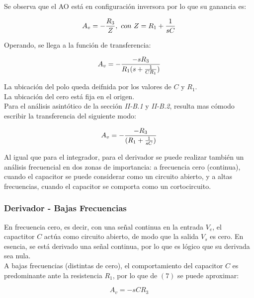 \documentclass[letterpaper, 10 pt, conference]{ieeeconf}  %
\begin{document}
Se observa que el AO está en configuración inversora por lo que su ganancia es:

            \begin{equation}
            A_v =- \frac{R_3}{Z}  , \ con \ Z = R_1 + \frac{1}{sC} \\
            \end{equation}

Operando, se llega a la función de transferencia:

            \begin{equation}
            A_v =-\frac{-sR_3}{R_1(s+\frac{1}{CR_1})}  \\
            \label{eq6}
            \end{equation}

La ubicación del polo queda deifnida por los valores de $C$ y $R_1$. \\
La ubicación del cero está fija en el origen. \\
Para el análisis asintótico de la sección \textit{II-B.1} y \textit{II-B.2}, resulta mas cómodo escribir la transferencia del siguiente modo:

\begin{equation}
            A_v =-\frac{-R_3}{(R_1+\frac{1}{sC})}  \\
            \end{equation}

Al igual que para el integrador, para el derivador se puede realizar también un análisis frecuencial en dos zonas de importancia: a frecuencia cero (continua), cuando el capacitor se puede considerar como un circuito abierto, y a altas frecuencias, cuando el capacitor se comporta como un cortocircuito. \\

\subsubsection{Derivador - Bajas Frecuencias}

En frecuencia cero, es decir, con una señal continua en la entrada $V_e$, el capactitor $C$ actúa como circuito abierto, de modo que la salida $V_s$ es cero. En esencia, se está derivado una señal continua, por lo que es lógico que su derivada sea nula.\\
A bajas frecuencias (distintas de cero), el comportamiento del capacitor $C$ es predominante ante la resistencia $R_1$, por lo que de $(7)$ se puede aproximar:

            \begin{equation}
            A_v =- sCR_3
            \end{equation}
\end{document}

